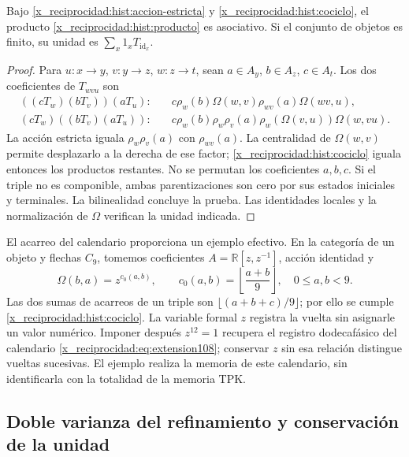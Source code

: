 \begin{proposition}
Bajo \eqref{x_reciprocidad:hist:accion-estricta} y \eqref{x_reciprocidad:hist:cociclo}, el producto
\eqref{x_reciprocidad:hist:producto} es asociativo. Si el conjunto de objetos es finito,
su unidad es \(\sum_x1_xT_{\operatorname{id}_x}\).
\end{proposition}
\begin{proof}
Para \(u:x\to y\), \(v:y\to z\), \(w:z\to t\), sean
\(a\in A_y\), \(b\in A_z\), \(c\in A_t\). Los dos coeficientes
de \(T_{wvu}\) son
\begin{align*}
 ((cT_w)(bT_v))(aT_u):\quad&
 c\rho_w(b)\Omega(w,v)\rho_{wv}(a)\Omega(wv,u),\\
 (cT_w)((bT_v)(aT_u)):\quad&
 c\rho_w(b)\rho_w\rho_v(a)\rho_w(\Omega(v,u))\Omega(w,vu).
\end{align*}
La acción estricta iguala \(\rho_w\rho_v(a)\) con \(\rho_{wv}(a)\).
La centralidad de \(\Omega(w,v)\) permite desplazarlo a la derecha de
ese factor; \eqref{x_reciprocidad:hist:cociclo} iguala entonces los productos restantes.
No se permutan los coeficientes \(a,b,c\). Si el triple no es componible,
ambas parentizaciones son cero por sus estados iniciales y terminales.
La bilinealidad concluye la prueba. Las identidades locales y la
normalización de \(\Omega\) verifican la unidad indicada.
\end{proof}

El acarreo del calendario proporciona un ejemplo efectivo. En la categoría
de un objeto y flechas \(C_9\), tomemos coeficientes
\(A=\mathbb R[z,z^{-1}]\), acción identidad y
\[
 \Omega(b,a)=z^{c_0(a,b)},\qquad
 c_0(a,b)=\left\lfloor\frac{a+b}{9}\right\rfloor,
 \quad 0\leq a,b<9.
\]
Las dos sumas de acarreos de un triple son
\(\lfloor(a+b+c)/9\rfloor\); por ello se cumple
\eqref{x_reciprocidad:hist:cociclo}. La variable formal \(z\) registra la vuelta sin
asignarle un valor numérico. Imponer después \(z^{12}=1\) recupera el
registro dodecafásico del calendario \eqref{x_reciprocidad:eq:extension108}; conservar
\(z\) sin esa relación distingue vueltas sucesivas. El ejemplo realiza
la memoria de este calendario, sin identificarla con la totalidad de la
memoria TPK.

\subsection{Doble varianza del refinamiento y conservación de la unidad}
\label{x_reciprocidad:hist:doble-varianza}

